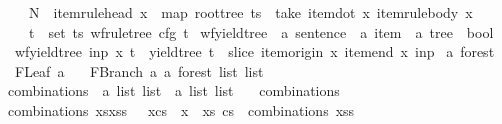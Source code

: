 \begin{isabellebody}
\ \ \ \ N\ {\isacharequal}{\kern0pt}\ item{\isacharunderscore}{\kern0pt}rule{\isacharunderscore}{\kern0pt}head\ x\ {\isasymand}\ map\ root{\isacharunderscore}{\kern0pt}tree\ ts\ {\isacharequal}{\kern0pt}\ take\ {\isacharparenleft}{\kern0pt}item{\isacharunderscore}{\kern0pt}dot\ x{\isacharparenright}{\kern0pt}\ {\isacharparenleft}{\kern0pt}item{\isacharunderscore}{\kern0pt}rule{\isacharunderscore}{\kern0pt}body\ x{\isacharparenright}{\kern0pt}\ {\isasymand}\isanewline
\ \ \ \ {\isacharparenleft}{\kern0pt}{\isasymforall}t\ {\isasymin}\ set\ ts{\isachardot}{\kern0pt}\ wf{\isacharunderscore}{\kern0pt}rule{\isacharunderscore}{\kern0pt}tree\ cfg\ t{\isacharparenright}{\kern0pt}{\isacharparenright}{\kern0pt}{\isachardoublequoteclose}\isanewline
\isanewline
{}\isamarkupfalse%
\ wf{\isacharunderscore}{\kern0pt}yield{\isacharunderscore}{\kern0pt}tree\ {\isacharcolon}{\kern0pt}{\isacharcolon}{\kern0pt}\ {\isachardoublequoteopen}{\isacharprime}{\kern0pt}a\ sentence\ {\isasymRightarrow}\ {\isacharprime}{\kern0pt}a\ item\ {\isasymRightarrow}\ {\isacharprime}{\kern0pt}a\ tree\ {\isasymRightarrow}\ bool{\isachardoublequoteclose}\ \isanewline
\ \ {\isachardoublequoteopen}wf{\isacharunderscore}{\kern0pt}yield{\isacharunderscore}{\kern0pt}tree\ inp\ x\ t\ {\isasymlongleftrightarrow}\ yield{\isacharunderscore}{\kern0pt}tree\ t\ {\isacharequal}{\kern0pt}\ slice\ {\isacharparenleft}{\kern0pt}item{\isacharunderscore}{\kern0pt}origin\ x{\isacharparenright}{\kern0pt}\ {\isacharparenleft}{\kern0pt}item{\isacharunderscore}{\kern0pt}end\ x{\isacharparenright}{\kern0pt}\ inp{\isachardoublequoteclose}\isanewline
\isanewline
{}\isamarkupfalse%
\ {\isacharprime}{\kern0pt}a\ forest\ {\isacharequal}{\kern0pt}\isanewline
\ \ FLeaf\ {\isacharprime}{\kern0pt}a\isanewline
\ \ {\isacharbar}{\kern0pt}\ FBranch\ {\isacharprime}{\kern0pt}a\ {\isachardoublequoteopen}{\isacharprime}{\kern0pt}a\ forest\ list\ list{\isachardoublequoteclose}\isanewline
\isanewline
{}\isamarkupfalse%
\ combinations\ {\isacharcolon}{\kern0pt}{\isacharcolon}{\kern0pt}\ {\isachardoublequoteopen}{\isacharprime}{\kern0pt}a\ list\ list\ {\isasymRightarrow}\ {\isacharprime}{\kern0pt}a\ list\ list{\isachardoublequoteclose}\ \isanewline
\ \ {\isachardoublequoteopen}combinations\ {\isacharbrackleft}{\kern0pt}{\isacharbrackright}{\kern0pt}\ {\isacharequal}{\kern0pt}\ {\isacharbrackleft}{\kern0pt}{\isacharbrackleft}{\kern0pt}{\isacharbrackright}{\kern0pt}{\isacharbrackright}{\kern0pt}{\isachardoublequoteclose}\isanewline
{\isacharbar}{\kern0pt}\ {\isachardoublequoteopen}combinations\ {\isacharparenleft}{\kern0pt}xs{\isacharhash}{\kern0pt}xss{\isacharparenright}{\kern0pt}\ {\isacharequal}{\kern0pt}\ {\isacharbrackleft}{\kern0pt}\ x{\isacharhash}{\kern0pt}cs\ {\isachardot}{\kern0pt}\ x\ {\isacharless}{\kern0pt}{\isacharminus}{\kern0pt}\ xs{\isacharcomma}{\kern0pt}\ cs\ {\isacharless}{\kern0pt}{\isacharminus}{\kern0pt}\ combinations\ xss\ {\isacharbrackright}{\kern0pt}{\isachardoublequoteclose}\isanewline

\end{isabellebody}
